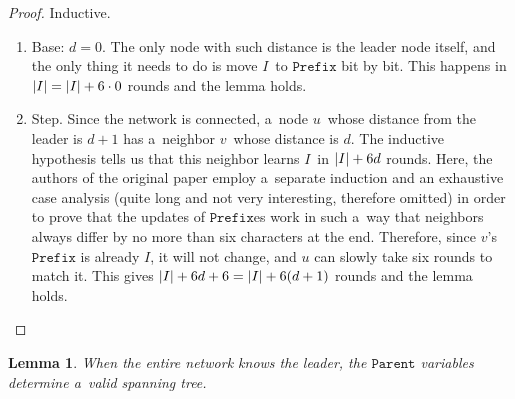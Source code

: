 \documentclass{article}
\newtheorem{lemma}{Lemma}
\DeclarePairedDelimiter{\parenthesesdelimiter}{(}{)}
\def\pars{\parenthesesdelimiter*}
\DeclarePairedDelimiter{\lendelimiter}{|}{|}
\def\len{\lendelimiter*}
\begin{document}
\begin{proof}
Inductive.
\begin{enumerate}[label={\arabic*.}]
    \item Base: \(d = 0\). The only node with such distance is the leader node itself, and the only thing it needs to do is move \(I\)~to \(\texttt{Prefix}\) bit by bit. This happens in \(\len{I} = \len{I} + 6 \cdot 0\) rounds and the lemma holds.
    \item Step. Since the network is connected, a~node \(u\)~whose distance from the leader is \(d + 1\) has a~neighbor \(v\)~whose distance is \(d\). The inductive hypothesis tells us that this neighbor learns \(I\)~in \(\len{I} + 6d\) rounds. Here, the authors of the original paper employ a~separate induction and an exhaustive case analysis (quite long and not very interesting, therefore omitted) in order to prove that the updates of \(\texttt{Prefix}\)es work in such a~way that neighbors always differ by no more than six characters at the end. Therefore, since \(v\)'s \(\texttt{Prefix}\) is already \(I\), it will not change, and \(u\) can slowly take six rounds to match it. This gives \(\len{I} + 6d + 6 = \len{I} + 6\pars{d + 1}\) rounds and the lemma holds.
\end{enumerate}
\end{proof}
\begin{lemma}
\label{lemma:spanning_tree}
When the entire network knows the leader, the \(\texttt{Parent}\) variables determine a~valid spanning tree.
\end{lemma}
\end{document}
